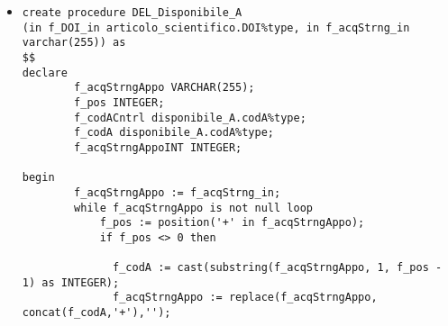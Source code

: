 \begin{itemize}
\begin{verbatim}
begin
        f_acqStrngAppo := f_acqStrng_in;
        while f_acqStrngAppo is not null loop
		
            f_pos := position('+' in f_acqStrngAppo);
            if f_pos <> 0 then 
		
             f_codA := cast(substring(f_acqStrngAppo, 1, f_pos - 1) as INTEGER);
             f_acqStrngAppo := replace(f_acqStrngAppo, concat(f_codA,'+'),'');
			
                select codA into f_codACntrl
                from disponibile_L 
                where ISBN = f_ISBN_in and codA = f_codA;

                if f_codACntrl is not null then 
                    Delete from disponibile_L
                    Where (CodA=f_codA AND  ISBN=f_ISBN_in);
                end if;
            else
			
                f_acqStrngAppoINT := cast(f_acqStrngAppo as INTEGER);
			
                select codA into f_codACntrl
                from disponibile_L 
                where ISBN = f_ISBN_in and codA = f_acqStrngAppoINT;
			
                if f_codACntrl is not null then 
                    Delete from disponibile_L
                    Where (CodA=f_acqStrngAppoINT AND  ISBN=f_ISBN_in);
                end if;
            f_acqStrngAppo := NULL;
            end if;
        end loop;
end;
$$
language plpgsql;
\end{verbatim}
{\bf Descrizione} : Funzione che data in ingresso un libro e una stringa composta da codici di Acquisti, separati da un '+', estrapola dalla stringa  gli acquisti e elimina la disponibilità del libro per gli Acquisti specificati.


\item\begin{verbatim}
create procedure DEL_Disponibile_A
(in f_DOI_in articolo_scientifico.DOI%type, in f_acqStrng_in varchar(255)) as
$$
declare
        f_acqStrngAppo VARCHAR(255);
        f_pos INTEGER;
        f_codACntrl disponibile_A.codA%type;
        f_codA disponibile_A.codA%type;
        f_acqStrngAppoINT INTEGER;
	
begin
        f_acqStrngAppo := f_acqStrng_in;
        while f_acqStrngAppo is not null loop
            f_pos := position('+' in f_acqStrngAppo);
            if f_pos <> 0 then 
		
              f_codA := cast(substring(f_acqStrngAppo, 1, f_pos - 1) as INTEGER);
              f_acqStrngAppo := replace(f_acqStrngAppo, concat(f_codA,'+'),'');
			

\end{verbatim}
\end{itemize}
